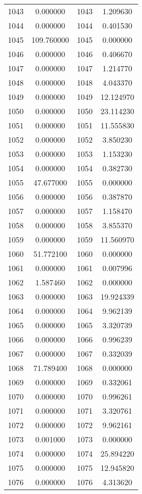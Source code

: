 \documentclass[12pt]{article}
\begin{document}
\begin{longtable}{@{}cccc@{}}
1043 & 0.000000 & 1043 & 1.209630 \\
1044 & 0.000000 & 1044 & 0.401530 \\
1045 & 109.760000 & 1045 & 0.000000 \\
1046 & 0.000000 & 1046 & 0.406670 \\
1047 & 0.000000 & 1047 & 1.214770 \\
1048 & 0.000000 & 1048 & 4.043370 \\
1049 & 0.000000 & 1049 & 12.124970 \\
1050 & 0.000000 & 1050 & 23.114230 \\
1051 & 0.000000 & 1051 & 11.555830 \\
1052 & 0.000000 & 1052 & 3.850230 \\
1053 & 0.000000 & 1053 & 1.153230 \\
1054 & 0.000000 & 1054 & 0.382730 \\
1055 & 47.677000 & 1055 & 0.000000 \\
1056 & 0.000000 & 1056 & 0.387870 \\
1057 & 0.000000 & 1057 & 1.158470 \\
1058 & 0.000000 & 1058 & 3.855370 \\
1059 & 0.000000 & 1059 & 11.560970 \\
1060 & 51.772100 & 1060 & 0.000000 \\
1061 & 0.000000 & 1061 & 0.007996 \\
1062 & 1.587460 & 1062 & 0.000000 \\
1063 & 0.000000 & 1063 & 19.924339 \\
1064 & 0.000000 & 1064 & 9.962139 \\
1065 & 0.000000 & 1065 & 3.320739 \\
1066 & 0.000000 & 1066 & 0.996239 \\
1067 & 0.000000 & 1067 & 0.332039 \\
1068 & 71.789400 & 1068 & 0.000000 \\
1069 & 0.000000 & 1069 & 0.332061 \\
1070 & 0.000000 & 1070 & 0.996261 \\
1071 & 0.000000 & 1071 & 3.320761 \\
1072 & 0.000000 & 1072 & 9.962161 \\
1073 & 0.001000 & 1073 & 0.000000 \\
1074 & 0.000000 & 1074 & 25.894220 \\
1075 & 0.000000 & 1075 & 12.945820 \\
1076 & 0.000000 & 1076 & 4.313620 \\

\end{longtable}
\end{document}
